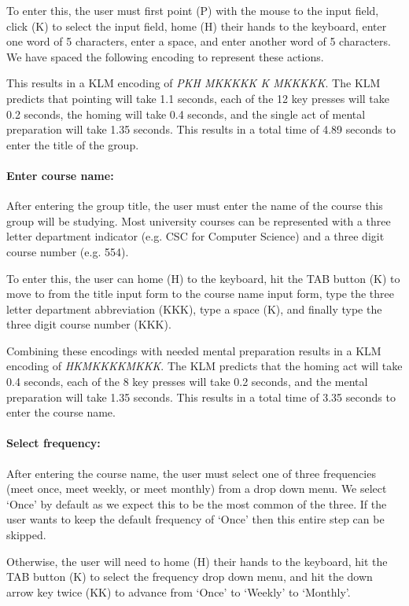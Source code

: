 \documentclass[conference]{IEEEtran}
\begin{document}
To enter this, the user must first point (P) with the mouse to the input field, click (K) to select the input field, home (H) their hands to the keyboard, enter one word of 5 characters, enter a space, and enter another word of 5 characters.
We have spaced the following encoding to represent these actions.

This results in a KLM encoding of \emph{PKH MKKKKK K MKKKKK}.
The KLM predicts that pointing will take 1.1 seconds, each of the 12 key presses will take 0.2 seconds, the homing will take 0.4 seconds, and the single act of mental preparation will take 1.35 seconds.
This results in a total time of 4.89 seconds to enter the title of the group.

\paragraph{Enter course name:}
After entering the group title, the user must enter the name of the course this group will be studying.
Most university courses can be represented with a three letter department indicator (e.g. CSC for Computer Science) and a three digit course number (e.g. 554).

To enter this, the user can home (H) to the keyboard, hit the TAB button (K) to move to from the title input form to the course name input form, type the three letter department abbreviation (KKK), type a space (K), and finally type the three digit course number (KKK).

Combining these encodings with needed mental preparation results in a KLM encoding of \emph{HKMKKKKMKKK}.
The KLM predicts that the homing act will take 0.4 seconds, each of the 8 key presses will take 0.2 seconds, and the mental preparation will take 1.35 seconds.
This results in a total time of 3.35 seconds to enter the course name.

\paragraph{Select frequency:}
After entering the course name, the user must select one of three frequencies (meet once, meet weekly, or meet monthly) from a drop down menu.
We select `Once' by default as we expect this to be the most common of the three.
If the user wants to keep the default frequency of `Once' then this entire step can be skipped.

Otherwise, the user will need to home (H) their hands to the keyboard, hit the TAB button (K) to select the frequency drop down menu, and hit the down arrow key twice (KK) to advance from `Once' to `Weekly' to `Monthly'.
\end{document}
